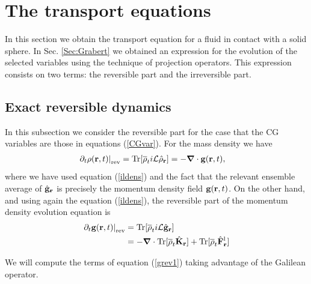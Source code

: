 \documentclass[b5paper,openright,10pt]{book}
\begin{document}
\section{The transport equations}
\label{Sec:Transequation}
In this section we obtain the transport equation for a fluid in contact with a solid sphere. In Sec. \ref{Sec:Grabert} we obtained an expression for the evolution of the selected variables using the technique of projection operators. This expression consists on two terms: the reversible part and the irreversible part. 

\subsection{Exact reversible dynamics}\label{Sec:ExactCont}
In this subsection we consider the reversible part for the case that the CG variables are those in equations (\ref{CGvar}).
For the mass density we have
\begin{align}
\left.\partial_t \rho({\bf r},t)\right|_{\rm rev}
&=  {\rm Tr}[\overline{\rho}_t  i{\cal L}\hat{\rho}_{\bf r}] 
=-\boldsymbol{\nabla}\cdot {\bf  g}({\bf r},t),
\label{conrho}
\end{align}
where we have used equation (\ref{ildens}) and the fact that the relevant
ensemble average of $\hat{\bf g}_{\bf  r}$ is precisely  the momentum
density field ${\bf g}({\bf r},t)$.  On the other hand, and using again the equation (\ref{ildens}), the reversible
part of the momentum density evolution equation is
\begin{align}
\left.\partial_t {\bf g}({\bf r},t)\right|_{\rm rev}
&=  {\rm Tr}[\overline{\rho}_t  i{\cal L}\hat{{\bf g}}_{\bf r}] 
\nonumber\\
&=-\boldsymbol{\nabla}\cdot  {\rm Tr}[\overline{\rho}_t \hat{{\bf K}}_{\bf r}] 
+  {\rm Tr}[\overline{\rho}_t  \hat{\bf F}^{\rm l}_{\bf r}]
\label{grev1}
\end{align}

We will compute the terms of equation (\ref{grev1}) taking advantage of the Galilean operator. 
\end{document}
